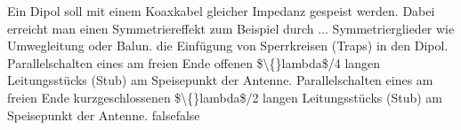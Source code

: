     {Ein Dipol soll mit einem Koaxkabel gleicher Impedanz gespeist werden. Dabei erreicht man einen Symmetriereffekt zum Beispiel durch ...}
    {Symmetrierglieder wie Umwegleitung oder Balun.}
    {die Einfügung von Sperrkreisen (Traps) in den Dipol.}
    {Parallelschalten eines am freien Ende offenen \$\textbackslash\{\}lambda\$/4 langen Leitungsstücks (Stub) am Speisepunkt der Antenne.}
    {Parallelschalten eines am freien Ende kurzgeschlossenen \$\textbackslash\{\}lambda\$/2 langen Leitungsstücks (Stub) am Speisepunkt der Antenne.}
    {false}{false}
